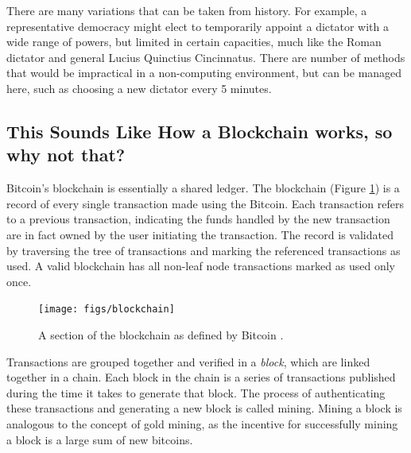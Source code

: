 \documentclass[11pt,letterpaper]{article}
\begin{document}
	There are many variations that can be taken from history.  
	For example, a representative democracy might elect to temporarily appoint a dictator with a wide range of powers, but limited in certain capacities, much like the Roman dictator and general Lucius Quinctius Cincinnatus.
	There are number of methods that would be impractical  in a non-computing  environment, but can be managed here, such as choosing a new dictator every 5 minutes.
	
	
	\subsection{This Sounds Like How a Blockchain works, so why not that?}
	

	Bitcoin's blockchain is essentially a shared ledger.  The blockchain (Figure \ref{fig:blockchain}) is a record of every single transaction made using the Bitcoin. Each transaction refers to  a previous transaction, indicating the funds handled by the new transaction are in fact owned by the user initiating the transaction. The record is validated by traversing the tree of transactions and marking the referenced transactions as used. A valid blockchain has all non-leaf node transactions marked as used only once.
	
	\begin{figure}
		\centering
		\texttt{[image: figs/blockchain]}
		\caption{A section of the blockchain as defined by Bitcoin \cite{bitcoin}.}
		\label{fig:blockchain}
	\end{figure}
	
	
	
	Transactions are grouped together and verified in a \emph{block}, which are linked together in a chain.  
	Each block in the chain is a series of transactions published during the time it takes to generate that block. 
	The process of authenticating these transactions and generating a new block is called mining.  
	Mining a block is analogous to the concept of gold mining, as the incentive for successfully mining a block is a large sum of new bitcoins.  
	
\end{document}
